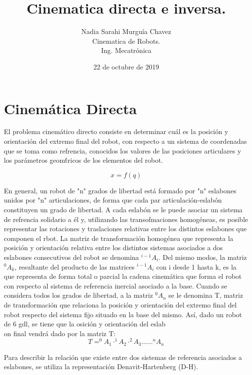 \documentclass[letter,openright,12pt,spanish]{report}
\title{\textbf{Cinematica directa e inversa.}}
\author{Nadia Sarahi Murgu\'ia Chavez\\
		Cinematica de Robots.\\
		Ing. Mecatr\'onica}
\date{22 de octubre de 2019}
\begin{document}
\maketitle

\section{Cinem\'atica Directa}

El problema cinem\'atico directo consiste en determinar cu\'al es la posici\'on y orientaci\'on del extremo final del robot, con respecto a un sistema de coordenadas que se toma como refrencia, conocidos los valores de las posiciones articulares y los par\'ametros geom\'tricos de los elementos del robot. 

\begin{displaymath}
x=\textit{f}(q)
\end{displaymath}

En general, un robot de "n" grados de libertad est\'a formado por "n" eslabones unidos por "n" articulaciones, de forma que cada par articulaci\'on-eslab\'on constituyen un grado de libertad. A cada eslab\'on se le puede asociar un sistema de refrencia solidario a \'el y, utilizando las transofmaciones homog\'eneas, es posible representar las rotaciones y traslaciones relativas entre los distintos eslabones que componen el rbot. La matriz de transformaci\'on homog\'enea que representa la posici\'on y orientaci\'on relativa entre los distintos sistemas asociados a dos eslabones consecutivos del robot se denomina $^{i-1}A_i$. Del mismo modos, la matriz $^0A_k$, resultante del producto de las matrices $^{i-1}A_i$ con i desde 1 hasta k, es la que representa de forma total o parcial la cadena cinem\'atica que forma el robot con respecto al sistema de referencia inercial asociado a la base. Cuando se considera todos los grados de libertad, a la matriz $^0A_n$ se le denomina T, matriz de transformaci\'on que relaciona la posici\'on y orientaci\'on del extremo final del robot respecto del sistema fijo situado en la base del mismo. As\'i, dado un robot de 6 gdl, se tiene que la osici\'on y orientaci\'on del eslab\\on final vendr\'a dado por la matriz T:\\

\begin{displaymath}
T=^0A_1 \cdot ^1A_2 \cdot ^2A_3... ... ^nA_n
\end{displaymath} 

Para describir la relaci\'on que existe entre dos sistemas de referencia asociados a eslabones, se utiliza la representaci\'on Denavit-Hartenberg (D-H). 
\end{document}
